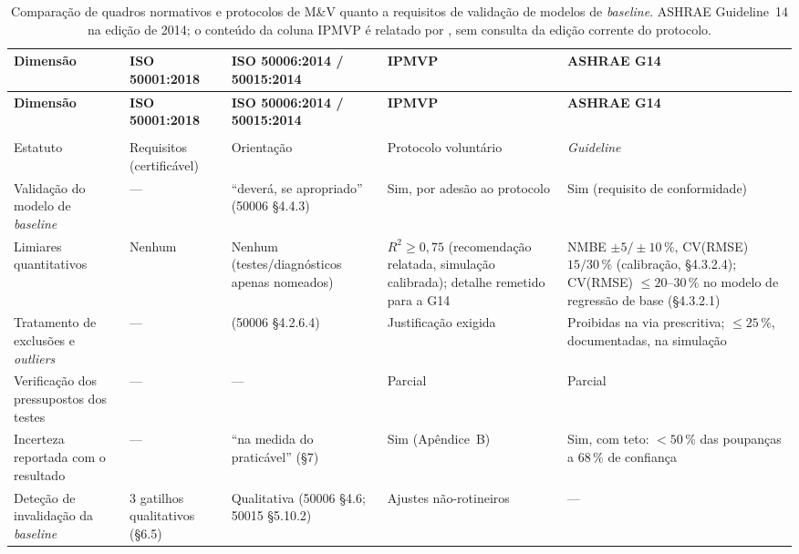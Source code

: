 {\footnotesize
\begin{xltabular}{\textwidth}{@{}>{\raggedright\arraybackslash}p{3.2cm} X X X X@{}}
\caption[Comparação de quadros normativos quanto a requisitos de validação]{Comparação de quadros normativos e protocolos de M\&V quanto a requisitos de validação de modelos de \emph{baseline}. ASHRAE Guideline~14 na edição de 2014; o conteúdo da coluna IPMVP é relatado por \textcite{RuizBandera2017}, sem consulta da edição corrente do protocolo.}\label{tab:comparacao-frameworks}\\
\toprule
\textbf{Dimensão} & \textbf{ISO 50001:2018} & \textbf{ISO 50006:2014 / 50015:2014} & \textbf{IPMVP} & \textbf{ASHRAE G14} \\
\midrule
\endfirsthead
\toprule
\textbf{Dimensão} & \textbf{ISO 50001:2018} & \textbf{ISO 50006:2014 / 50015:2014} & \textbf{IPMVP} & \textbf{ASHRAE G14} \\
\midrule
\endhead
\midrule
{}\\
\endfoot
\bottomrule
\endlastfoot
    Estatuto & Requisitos (certificável) & Orientação & Protocolo voluntário & \emph{Guideline} \\
    \addlinespace
    Validação do modelo de \emph{baseline} & --- & \enquote{deverá, se apropriado} (50006 \S4.4.3) & Sim, por adesão ao protocolo & Sim (requisito de conformidade) \\
    \addlinespace
    Limiares quantitativos & Nenhum & Nenhum (testes/diagnósticos apenas nomeados) & $R^2 \geq 0{,}75$ (recomendação relatada, simulação calibrada); detalhe remetido para a G14 & NMBE $\pm5/\pm10\,\%$, CV(RMSE) $15/30\,\%$ (calibração, \S4.3.2.4); CV(RMSE) $\leq 20$--$30\,\%$ no modelo de regressão de base (\S4.3.2.1) \\
    \addlinespace
    Tratamento de exclusões e \emph{outliers} & --- &  (50006 \S4.2.6.4) & Justificação exigida & Proibidas na via prescritiva; $\leq 25\,\%$, documentadas, na simulação \\
    \addlinespace
    Verificação dos pressupostos dos testes & --- & --- & Parcial & Parcial \\
    \addlinespace
    Incerteza reportada com o resultado & --- & 
    \enquote{na medida do praticável} (\S7) & Sim (Apêndice~B) & Sim, com teto: $<50\,\%$ das poupanças a $68\,\%$ de confiança \\
    \addlinespace
    Deteção de invalidação da \emph{baseline} & 3 gatilhos qualitativos (\S6.5) & Qualitativa (50006 \S4.6; 50015 \S5.10.2) & Ajustes não-rotineiros & --- \\
\end{xltabular}
}

